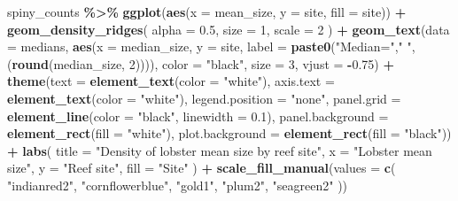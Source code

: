 \documentclass[
]{article}
\newenvironment{Shaded}{\begin{snugshade}}{\end{snugshade}}
\newcommand{\AttributeTok}[1]{\textcolor[rgb]{0.13,0.29,0.53}{#1}}
\newcommand{\DecValTok}[1]{\textcolor[rgb]{0.00,0.00,0.81}{#1}}
\newcommand{\FloatTok}[1]{\textcolor[rgb]{0.00,0.00,0.81}{#1}}
\newcommand{\FunctionTok}[1]{\textcolor[rgb]{0.13,0.29,0.53}{\textbf{#1}}}
\newcommand{\NormalTok}[1]{#1}
\newcommand{\SpecialCharTok}[1]{\textcolor[rgb]{0.81,0.36,0.00}{\textbf{#1}}}
\newcommand{\StringTok}[1]{\textcolor[rgb]{0.31,0.60,0.02}{#1}}
\begin{document}
\begin{Shaded}
\begin{Highlighting}[]
\NormalTok{spiny\_counts }\SpecialCharTok{\%\textgreater{}\%} 
  \FunctionTok{ggplot}\NormalTok{(}\FunctionTok{aes}\NormalTok{(}\AttributeTok{x =}\NormalTok{ mean\_size, }\AttributeTok{y =}\NormalTok{ site, }\AttributeTok{fill =}\NormalTok{ site)) }\SpecialCharTok{+}
  \FunctionTok{geom\_density\_ridges}\NormalTok{(}
    \AttributeTok{alpha =} \FloatTok{0.5}\NormalTok{,}
    \AttributeTok{size =} \DecValTok{1}\NormalTok{,}
    \AttributeTok{scale =} \DecValTok{2}
\NormalTok{  ) }\SpecialCharTok{+}
  \FunctionTok{geom\_text}\NormalTok{(}\AttributeTok{data =}\NormalTok{ medians, }
            \FunctionTok{aes}\NormalTok{(}\AttributeTok{x =}\NormalTok{ median\_size, }
                \AttributeTok{y =}\NormalTok{ site, }
                \AttributeTok{label =} \FunctionTok{paste0}\NormalTok{(}\StringTok{"Median="}\NormalTok{,}\StringTok{" "}\NormalTok{,(}\FunctionTok{round}\NormalTok{(median\_size, }\DecValTok{2}\NormalTok{)))),}
            \AttributeTok{color =} \StringTok{"black"}\NormalTok{, }
            \AttributeTok{size =} \DecValTok{3}\NormalTok{, }
            \AttributeTok{vjust =} \SpecialCharTok{{-}}\FloatTok{0.75}\NormalTok{) }\SpecialCharTok{+}
  \FunctionTok{theme}\NormalTok{(}\AttributeTok{text =} \FunctionTok{element\_text}\NormalTok{(}\AttributeTok{color =} \StringTok{"white"}\NormalTok{),}
        \AttributeTok{axis.text =} \FunctionTok{element\_text}\NormalTok{(}\AttributeTok{color =} \StringTok{"white"}\NormalTok{),}
        \AttributeTok{legend.position =} \StringTok{"none"}\NormalTok{,}
        \AttributeTok{panel.grid =} \FunctionTok{element\_line}\NormalTok{(}\AttributeTok{color =} \StringTok{"black"}\NormalTok{,}
                                  \AttributeTok{linewidth =} \FloatTok{0.1}\NormalTok{),}
        \AttributeTok{panel.background =} \FunctionTok{element\_rect}\NormalTok{(}\AttributeTok{fill =} \StringTok{"white"}\NormalTok{),}
        \AttributeTok{plot.background =} \FunctionTok{element\_rect}\NormalTok{(}\AttributeTok{fill =} \StringTok{"black"}\NormalTok{)) }\SpecialCharTok{+}
  \FunctionTok{labs}\NormalTok{(}
    \AttributeTok{title =} \StringTok{"Density of lobster mean size by reef site"}\NormalTok{,}
    \AttributeTok{x =} \StringTok{"Lobster mean size"}\NormalTok{, }
    \AttributeTok{y =} \StringTok{"Reef site"}\NormalTok{,}
    \AttributeTok{fill =} \StringTok{"Site"}
\NormalTok{  ) }\SpecialCharTok{+}
  \FunctionTok{scale\_fill\_manual}\NormalTok{(}\AttributeTok{values =} \FunctionTok{c}\NormalTok{(}
    \StringTok{"indianred2"}\NormalTok{, }\StringTok{"cornflowerblue"}\NormalTok{, }\StringTok{"gold1"}\NormalTok{, }\StringTok{"plum2"}\NormalTok{, }\StringTok{"seagreen2"}
\NormalTok{  )) }
\end{Highlighting}
\end{Shaded}
\end{document}
